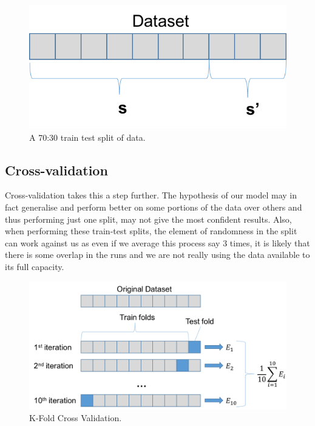 \documentclass[12pt,a4paper,twoside]{report}
\begin{document}
\begin{figure}[H]

\centering
\includegraphics[scale=0.8]{train-test-split}
\caption{A 70:30 train test split of data.}
\end{figure}

\subsection{Cross-validation}

Cross-validation takes this a step further. The hypothesis of our model may in fact generalise and perform better on some portions of the data over others and thus performing just one split, may not give the most confident results. Also, when performing these train-test splits, the element of randomness in the split can work against us as even if we average this process say 3 times, it is likely that there is some overlap in the runs and we are not really using the data available to its full capacity. 

\begin{figure}[H]

\centering
\includegraphics[scale=0.8]{cross-val}
\caption{K-Fold Cross Validation.}
\end{figure}
\end{document}
